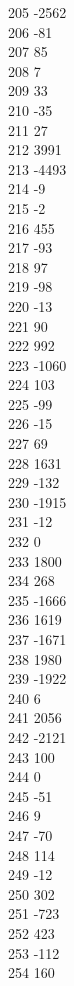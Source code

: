 { 205	-2562 \\
 206	-81 \\
 207	85 \\
 208	7 \\
 209	33 \\
 210	-35 \\
 211	27 \\
 212	3991 \\
 213	-4493 \\
 214	-9 \\
 215	-2 \\
 216	455 \\
 217	-93 \\
 218	97 \\
 219	-98 \\
 220	-13 \\
 221	90 \\
 222	992 \\
 223	-1060 \\
 224	103 \\
 225	-99 \\
 226	-15 \\
 227	69 \\
 228	1631 \\
 229	-132 \\
 230	-1915 \\
 231	-12 \\
 232	0 \\
 233	1800 \\
 234	268 \\
 235	-1666 \\
 236	1619 \\
 237	-1671 \\
 238	1980 \\
 239	-1922 \\
 240	6 \\
 241	2056 \\
 242	-2121 \\
 243	100 \\
 244	0 \\
 245	-51 \\
 246	9 \\
 247	-70 \\
 248	114 \\
 249	-12 \\
 250	302 \\
 251	-723 \\
 252	423 \\
 253	-112 \\
 254	160 \\
}
